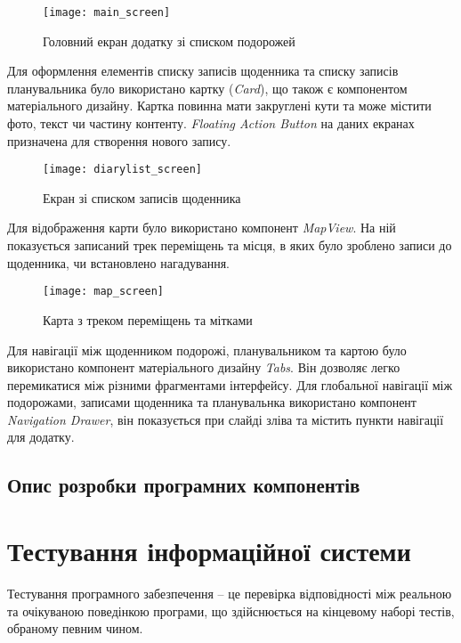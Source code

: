 \documentclass[../main.tex]{subfiles}
\begin{document}
\begin{figure}[H]
	\centering
	\texttt{[image: main\_screen]}
	\caption{Головний екран додатку зі списком подорожей}
	\label{figure:main_screen}
\end{figure}

Для оформлення елементів списку записів щоденника та списку записів планувальника було використано картку (\textit{Card}), що також є компонентом матеріального дизайну. Картка повинна мати закруглені кути та може містити фото, текст чи частину контенту. \textit{Floating Action Button} на даних екранах призначена для створення нового запису.

\begin{figure}[H]
	\centering
	\texttt{[image: diarylist\_screen]}
	\caption{Екран зі списком записів щоденника}
	\label{figure:diary_list_screen}
\end{figure}

Для відображення карти було використано компонент \textit{MapView}. На ній показується записаний трек переміщень та місця, в яких було зроблено записи до щоденника, чи встановлено нагадування.

\begin{figure}[H]
	\centering
	\texttt{[image: map\_screen]}
	\caption{Карта з треком переміщень та мітками}
	\label{figure:map_screen}
\end{figure}

Для навігації між щоденником подорожі, планувальником та картою було використано компонент матеріального дизайну \textit{Tabs}. Він дозволяє легко перемикатися між різними фрагментами інтерфейсу. Для глобальної навігації між подорожами, записами щоденника та планувальнка використано компонент \textit{Navigation Drawer}, він показується при слайді зліва та містить пункти навігації для додатку. 

\subsection{Опис розробки програмних компонентів}

\section{Тестування інформаційної системи}

Тестування програмного забезпечення -- це перевірка відповідності між реальною та очікуваною поведінкою програми, що здійснюється на кінцевому наборі тестів, обраному певним чином.
\end{document}
